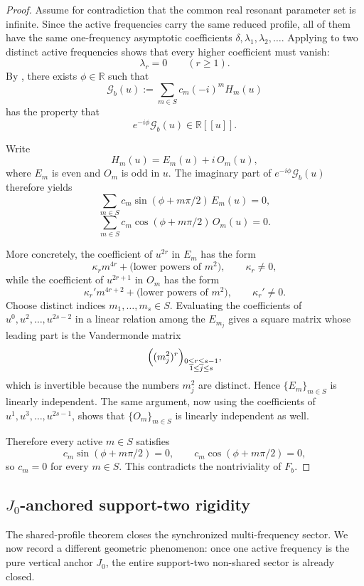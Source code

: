 \documentclass[11pt,reqno]{amsart}
\theoremstyle{definition}
\newcommand{\R}{\mathbb{R}}
\begin{document}
\begin{proof}
Assume for contradiction that the common real resonant parameter set is infinite. Since the
active frequencies carry the same reduced profile, all of them have the same one-frequency
asymptotic coefficients $\delta,\lambda_1,\lambda_2,\dots$. Applying
 to two distinct active frequencies shows that every
higher coefficient must vanish:
\[
\lambda_r=0
\qquad (r\ge 1).
\]
By , there exists $\phi\in\R$ such that
\[
\mathcal G_b(u):=\sum_{m\in S} c_m (-i)^m H_m(u)
\]
has the property that
\[
e^{-i\phi}\mathcal G_b(u)\in \R[[u]].
\]

Write
\[
H_m(u)=E_m(u)+i\,O_m(u),
\]
where $E_m$ is even and $O_m$ is odd in $u$. The imaginary part of
$e^{-i\phi}\mathcal G_b(u)$ therefore yields
\[
\sum_{m\in S} c_m \sin(\phi+m\pi/2)\,E_m(u)=0,
\]
\[
\sum_{m\in S} c_m \cos(\phi+m\pi/2)\,O_m(u)=0.
\]

More concretely, the coefficient of $u^{2r}$ in $E_m$ has the form
\[
\kappa_r m^{4r}+\text{(lower powers of $m^2$)},
\qquad
\kappa_r\neq 0,
\]
while the coefficient of $u^{2r+1}$ in $O_m$ has the form
\[
\kappa_r' m^{4r+2}+\text{(lower powers of $m^2$)},
\qquad
\kappa_r'\neq 0.
\]
Choose distinct indices $m_1,\dots,m_s\in S$. Evaluating the coefficients of
$u^0,u^2,\dots,u^{2s-2}$ in a linear relation among the $E_{m_j}$ gives a square matrix whose
leading part is the Vandermonde matrix
\[
\Bigl((m_j^2)^r\Bigr)_{
\substack{0\le r\le s-1\\ 1\le j\le s}},
\]
which is invertible because the numbers $m_j^2$ are distinct. Hence
$\{E_m\}_{m\in S}$ is linearly independent. The same argument, now using the coefficients of
$u^1,u^3,\dots,u^{2s-1}$, shows that $\{O_m\}_{m\in S}$ is linearly independent as well.

Therefore every active $m\in S$ satisfies
\[
c_m\sin(\phi+m\pi/2)=0,
\qquad
c_m\cos(\phi+m\pi/2)=0,
\]
so $c_m=0$ for every $m\in S$. This contradicts the nontriviality of $F_b$.
\end{proof}

\subsection*{$J_0$-anchored support-two rigidity}

The shared-profile theorem closes the synchronized multi-frequency sector. We now record a
different geometric phenomenon: once one active frequency is the pure vertical anchor $J_0$, the
entire support-two non-shared sector is already closed.
\end{document}
